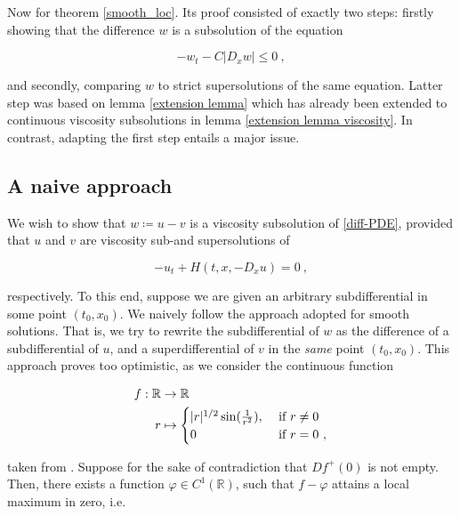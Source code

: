 	Now for theorem \ref{smooth_loc}. Its proof consisted of exactly two steps: firstly showing that the difference $ w $ is a subsolution of the equation
	
	\begin{equation*}
		-w_t - C \lvert D_x w \rvert \leq 0 \ ,
	\end{equation*}
	
	and secondly, comparing $ w $ to strict supersolutions of the same equation. Latter step was based on lemma \ref{extension lemma} which has already been extended to continuous viscosity subsolutions in lemma \ref{extension lemma viscosity}. In contrast, adapting the first step entails a major issue. 

	\subsection{A naive approach}
		\label{naive}
		
		We wish to show that $ w \coloneqq u - v $ is a viscosity subsolution of \eqref{diff-PDE}, provided that $ u $ and $ v $ are viscosity sub-and supersolutions of
		
		\begin{equation*}
				-u_t + H(t, x, -D_x u) = 0 \ ,
		\end{equation*}
		
		respectively. To this end, suppose we are given an arbitrary subdifferential in some point $ (t_0, x_0) $. We naively follow the approach adopted for smooth solutions. That is, we try to rewrite the subdifferential of $ w $ as the difference of a subdifferential of $ u $, and a superdifferential of $ v $ in the \emph{same} point $ (t_0, x_0) $. This approach proves too optimistic, as we consider the continuous function
		
		\begin{align*}
			f : \mathbb{R} &\to \mathbb{R} \\
			r &\mapsto \begin{cases}
			\lvert r \rvert^{1/2} \sin(\frac{1}{r^2}), &\hbox{ if } r \neq 0 \\
			0 &\hbox{ if } r = 0  \ ,
			\end{cases}
		\end{align*}
		
		taken from \cite[p.~32, exercise 1.5]{bardi2008optimal}. Suppose for the sake of contradiction that $ Df^{+}(0) $ is not empty. Then, there exists a function $ \varphi \in C^1(\mathbb{R}) $, such that $ f - \varphi $ attains a local maximum in zero, i.e.
		
